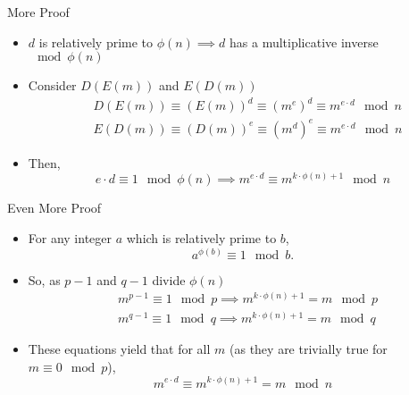 \documentclass[handout, aspectratio=169]{beamer}
\begin{document}
\begin{frame}{More Proof}
    \begin{itemize}
    \item $d$ is relatively prime to $\phi(n) \implies d$ has a multiplicative inverse $\mod \phi(n)$
    
    \item Consider $D(E(m))$ and $E(D(m))$
    \begin{equation*}
    \begin{split}
        &D(E(m)) \equiv (E(m))^d \equiv (m^e)^d \equiv m^{e \cdot d} \mod n \\
        &E(D(m)) \equiv (D(m))^e \equiv (m^d)^e \equiv m^{e \cdot d} \mod n
    \end{split}
    \end{equation*}
    \item Then,
    \begin{equation*}
        e \cdot d \equiv 1 \mod \phi(n) \implies m^{e \cdot d} \equiv m^{k \cdot \phi(n) + 1}  \mod n
    \end{equation*}

    \end{itemize}
\end{frame}

\begin{frame}{Even More Proof}
    \begin{itemize}
    \item For any integer $a$ which is relatively prime to $b$,
        \begin{equation*}
            a^{\phi(b)} \equiv 1 \mod b.           
        \end{equation*}
    \item So, as $p - 1$ and $q - 1$ divide $\phi(n)$
    \begin{equation*}
    \begin{split}
            &m^{p - 1} \equiv 1 \mod p \implies m^{k \cdot \phi(n) + 1} = m \mod p \\
            &m^{q - 1} \equiv 1 \mod q \implies m^{k \cdot \phi(n) + 1} = m \mod q
    \end{split}
    \end{equation*}
    \item These equations yield that for all $m$ (as they are trivially true for $m \equiv 0 \mod p$),
    \begin{equation*}
        m^{e \cdot d} \equiv m^{k \cdot \phi(n) + 1} = m \mod n
    \end{equation*}
    \end{itemize}
\end{frame}
\end{document}
